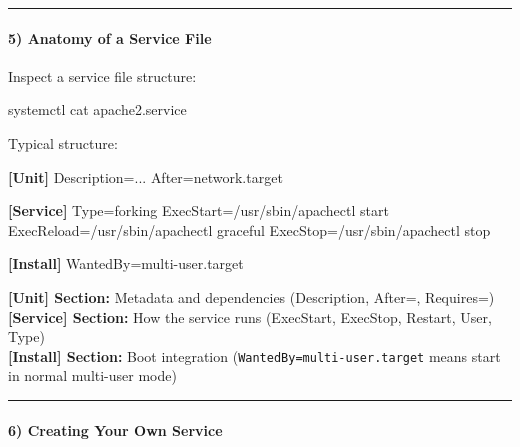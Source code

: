 \documentclass[
  english,
  paper=a4,
  oneside  ,captions=tableheading
]{scrartcl}
\newenvironment{Shaded}{}{}
\newcommand{\DataTypeTok}[1]{\textcolor[rgb]{0.56,0.13,0.00}{#1}}
\newcommand{\ExtensionTok}[1]{#1}
\newcommand{\KeywordTok}[1]{\textcolor[rgb]{0.00,0.44,0.13}{\textbf{#1}}}
\newcommand{\NormalTok}[1]{#1}
\newcommand{\OtherTok}[1]{\textcolor[rgb]{0.00,0.44,0.13}{#1}}
\newcommand{\StringTok}[1]{\textcolor[rgb]{0.25,0.44,0.63}{#1}}
\begin{document}
\begin{center}\rule{0.5\linewidth}{0.5pt}\end{center}

\paragraph{5) Anatomy of a Service
File}\label{anatomy-of-a-service-file}

Inspect a service file structure:

\begin{Shaded}
\begin{Highlighting}[]
\ExtensionTok{systemctl}\NormalTok{ cat apache2.service}
\end{Highlighting}
\end{Shaded}

Typical structure:

\begin{Shaded}
\begin{Highlighting}[]
\KeywordTok{[Unit]}
\DataTypeTok{Description}\OtherTok{=}\StringTok{...}
\DataTypeTok{After}\OtherTok{=}\StringTok{network.target}

\KeywordTok{[Service]}
\DataTypeTok{Type}\OtherTok{=}\StringTok{forking}
\DataTypeTok{ExecStart}\OtherTok{=}\StringTok{/usr/sbin/apachectl start}
\DataTypeTok{ExecReload}\OtherTok{=}\StringTok{/usr/sbin/apachectl graceful}
\DataTypeTok{ExecStop}\OtherTok{=}\StringTok{/usr/sbin/apachectl stop}

\KeywordTok{[Install]}
\DataTypeTok{WantedBy}\OtherTok{=}\StringTok{multi{-}user.target}
\end{Highlighting}
\end{Shaded}

\textbf{{[}Unit{]} Section:} Metadata and dependencies (Description,
After=, Requires=)\\
\textbf{{[}Service{]} Section:} How the service runs (ExecStart,
ExecStop, Restart, User, Type)\\
\textbf{{[}Install{]} Section:} Boot integration
(\texttt{WantedBy=multi-user.target} means start in normal multi-user
mode)

\begin{center}\rule{0.5\linewidth}{0.5pt}\end{center}

\paragraph{6) Creating Your Own
Service}\label{creating-your-own-service}
\end{document}
